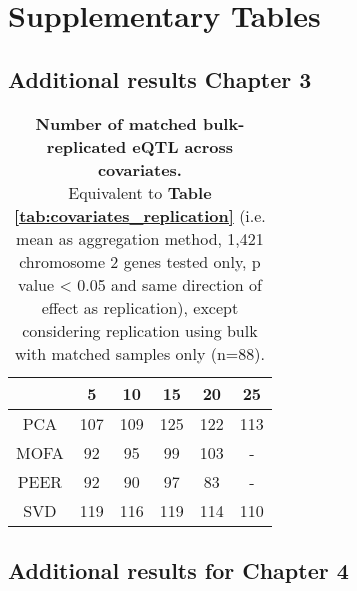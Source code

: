 \chapter{Supplementary Tables} 

\section{Additional results Chapter 3}

\begin{table}[h]
    \centering
    \begin{tabular}{c|c c c c c}
    &       5 & 10 & 15 & 20 & 25  \\
    \hline
    PCA   & 107 & 109 &  125 & 122 & 113 \\
    MOFA  &  92 &  95 &   99 & 103 & -   \\
    PEER  &  92 &  90 &   97 &  83 & -   \\
    SVD   & 119 & 116 &  119 & 114 & 110 \\
    \end{tabular}
    \caption[Covariate comparison in terms of replication of matched bulk results]{\textbf{Number of matched bulk-replicated eQTL across covariates.} \\
    Equivalent to \textbf{Table \ref{tab:covariates_replication}} (i.e. mean as aggregation method, 1,421 chromosome 2 genes tested only, p value < 0.05 and same direction of effect as replication), except considering replication using bulk with matched samples only (n=88).}
    \label{tab:covariates_replication_matched_bulk}
\end{table}

\newpage

\section{Additional results for Chapter 4}

